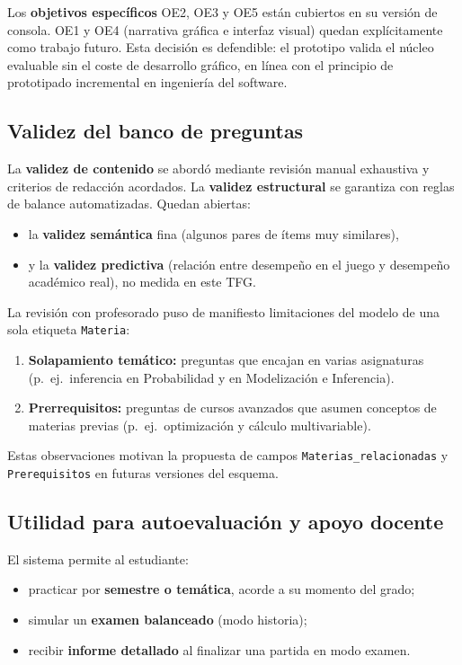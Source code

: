 \documentclass[11pt,a4paper]{article}
\begin{document}
Los \textbf{objetivos específicos} OE2, OE3 y OE5 están cubiertos en su versión de consola. OE1 y OE4 (narrativa gráfica e interfaz visual) quedan explícitamente como trabajo futuro. Esta decisión es defendible: el prototipo valida el núcleo evaluable sin el coste de desarrollo gráfico, en línea con el principio de prototipado incremental en ingeniería del software.

\subsection{Validez del banco de preguntas}

La \textbf{validez de contenido} se abordó mediante revisión manual exhaustiva y criterios de redacción acordados. La \textbf{validez estructural} se garantiza con reglas de balance automatizadas. Quedan abiertas:
\begin{itemize}
  \item la \textbf{validez semántica} fina (algunos pares de ítems muy similares),
  \item y la \textbf{validez predictiva} (relación entre desempeño en el juego y desempeño académico real), no medida en este TFG.
\end{itemize}

La revisión con profesorado puso de manifiesto limitaciones del modelo de una sola etiqueta \texttt{Materia}:
\begin{enumerate}
  \item \textbf{Solapamiento temático:} preguntas que encajan en varias asignaturas (p.\ ej.\ inferencia en Probabilidad y en Modelización e Inferencia).
  \item \textbf{Prerrequisitos:} preguntas de cursos avanzados que asumen conceptos de materias previas (p.\ ej.\ optimización y cálculo multivariable).
\end{enumerate}

Estas observaciones motivan la propuesta de campos \texttt{Materias\_relacionadas} y \texttt{Prerequisitos} en futuras versiones del esquema.

\subsection{Utilidad para autoevaluación y apoyo docente}

El sistema permite al estudiante:
\begin{itemize}
  \item practicar por \textbf{semestre o temática}, acorde a su momento del grado;
  \item simular un \textbf{examen balanceado} (modo historia);
  \item recibir \textbf{informe detallado} al finalizar una partida en modo examen.
\end{itemize}
\end{document}
